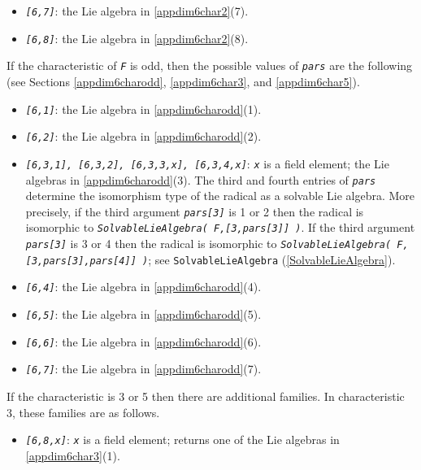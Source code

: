 \documentclass[a4paper,11pt]{report}
\begin{document}
{{{\begin{itemize}
\item  \mbox{\texttt{\mdseries\slshape [6,7]}}: the Lie algebra in \ref{appdim6char2}(7). 
\item  \mbox{\texttt{\mdseries\slshape [6,8]}}: the Lie algebra in \ref{appdim6char2}(8).
\end{itemize}
 If the characteristic of \mbox{\texttt{\mdseries\slshape F}} is odd, then the possible values of \mbox{\texttt{\mdseries\slshape pars}} are the following (see Sections \ref{appdim6charodd}, \ref{appdim6char3}, and \ref{appdim6char5}). 
\begin{itemize}
\item  \mbox{\texttt{\mdseries\slshape [6,1]}}: the Lie algebra in \ref{appdim6charodd}(1).
\item  \mbox{\texttt{\mdseries\slshape [6,2]}}: the Lie algebra in \ref{appdim6charodd}(2).
\item \mbox{\texttt{\mdseries\slshape [6,3,1], [6,3,2], [6,3,3,x], [6,3,4,x]}}: \mbox{\texttt{\mdseries\slshape x}} is a field element; the Lie algebras in \ref{appdim6charodd}(3). The third and fourth entries of \mbox{\texttt{\mdseries\slshape pars}} determine the isomorphism type of the radical as a solvable Lie algebra. More
precisely, if the third argument \mbox{\texttt{\mdseries\slshape pars[3]}} is 1 or 2 then the radical is isomorphic to \mbox{\texttt{\mdseries\slshape SolvableLieAlgebra( F,[3,pars[3]] )}}. If the third argument \mbox{\texttt{\mdseries\slshape pars[3]}} is 3 or 4 then the radical is isomorphic to \mbox{\texttt{\mdseries\slshape SolvableLieAlgebra( F,[3,pars[3],pars[4]] )}}; see \texttt{SolvableLieAlgebra} (\ref{SolvableLieAlgebra}). 
\item \mbox{\texttt{\mdseries\slshape [6,4]}}: the Lie algebra in \ref{appdim6charodd}(4).
\item \mbox{\texttt{\mdseries\slshape [6,5]}}: the Lie algebra in \ref{appdim6charodd}(5).
\item \mbox{\texttt{\mdseries\slshape [6,6]}}: the Lie algebra in \ref{appdim6charodd}(6).
\item \mbox{\texttt{\mdseries\slshape [6,7]}}: the Lie algebra in \ref{appdim6charodd}(7).
\end{itemize}
 If the characteristic is 3 or 5 then there are additional families. In
characteristic 3, these families are as follows. 
\begin{itemize}
\item  \mbox{\texttt{\mdseries\slshape [6,8,x]}}: \mbox{\texttt{\mdseries\slshape x}} is a field element; returns one of the Lie algebras in \ref{appdim6char3}(1).

\end{itemize}}}}
\end{document}
